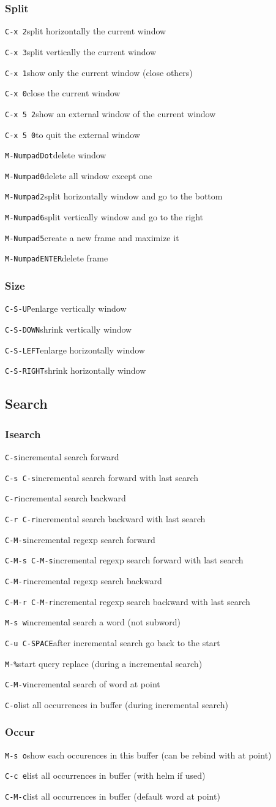 \documentclass[10pt,landscape]{article}
\def\cm#1#2{{\tt#1}\dotfill#2\par}
\begin{document}
\begin{multicols}{3}
\subsubsection{Split}
\cm{C-x 2}{split horizontally the current window}
\cm{C-x 3}{split vertically the current window}
\cm{C-x 1}{show only the current window (close others)}
\cm{C-x 0}{close the current window}
\cm{C-x 5 2}{show an external window of the current window}
\cm{C-x 5 0}{to quit the external window}
\cm{M-NumpadDot}{delete window}
\cm{M-Numpad0}{delete all window except one}
\cm{M-Numpad2}{split horizontally window and go to the bottom}
\cm{M-Numpad6}{split vertically window and go to the right}
\cm{M-Numpad5}{create a new frame and maximize it}
\cm{M-NumpadENTER}{delete frame}

\subsubsection{Size}
\cm{C-S-UP}{enlarge vertically window}
\cm{C-S-DOWN}{shrink vertically window}
\cm{C-S-LEFT}{enlarge horizontally window}
\cm{C-S-RIGHT}{shrink horizontally window}

\subsection{Search}

\subsubsection{Isearch}
\cm{C-s}{incremental search forward}
\cm{C-s C-s}{incremental search forward with last search}
\cm{C-r}{incremental search backward}
\cm{C-r C-r}{incremental search backward with last search}
\cm{C-M-s}{incremental regexp search forward}
\cm{C-M-s C-M-s}{incremental regexp search forward with last search}
\cm{C-M-r}{incremental regexp search backward}
\cm{C-M-r C-M-r}{incremental regexp search backward with last search}
\cm{M-s w}{incremental search a word (not subword)}
\cm{C-u C-SPACE}{after incremental search go back to the start}
\cm{M-\%}{start query replace (during a incremental search)}
\cm{C-M-v}{incremental search of word at point}
\cm{C-o}{list all occurrences in buffer (during incremental search)}

\subsubsection{Occur}
\cm{M-s o}{show each occurences in this buffer (can be rebind with at point)}
\cm{C-c e}{list all occurrences in buffer (with helm if used)}
\cm{C-M-c}{list all occurrences in buffer (default word at point)}


\end{multicols}
\end{document}
